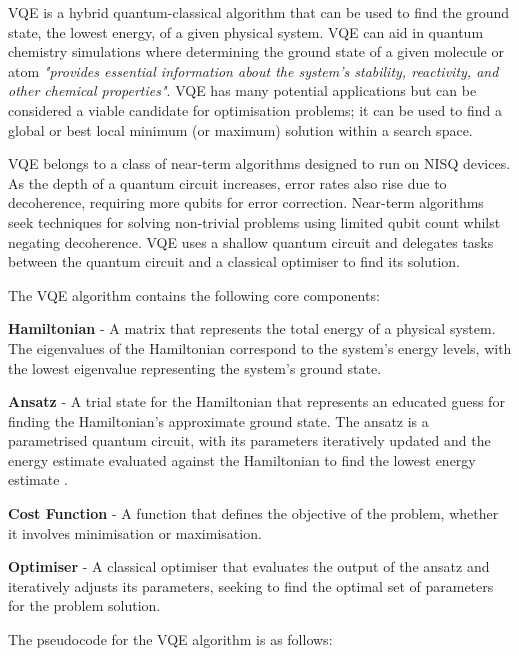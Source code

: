 \documentclass{article}
\begin{document}
{VQE is a hybrid quantum-classical algorithm that can be used to find the ground state, the lowest energy, of a given physical system\cite{wikivqe}. VQE can aid in quantum chemistry simulations where determining the ground state of a given molecule or atom \textit{"provides essential information about the system's stability, reactivity, and other chemical properties"}\cite{queragroundstate}. VQE has many potential applications but can be considered a viable candidate for optimisation problems; it can be used to find a global or best local minimum (or maximum) solution within a search space\cite{vqeqiskit}\cite{VQEMax}. 

VQE belongs to a class of near-term algorithms designed to run on NISQ devices. As the depth of a quantum circuit increases, error rates also rise due to decoherence, requiring more qubits for error correction. Near-term algorithms seek techniques for solving non-trivial problems using limited qubit count whilst negating decoherence\cite{Huang_2023}. VQE uses a shallow quantum circuit and delegates tasks between the quantum circuit and a classical optimiser to find its solution\cite{vqeqiskit}\cite{Peruzzo2014}.

The VQE algorithm contains the following core components:

\textbf{Hamiltonian} - A matrix that represents the total energy of a physical system\cite{hamiltonian}. The eigenvalues of the Hamiltonian correspond to the system's energy levels, with the lowest eigenvalue representing the system's ground state\cite{vqeqiskit}.

\textbf{Ansatz} - A trial state for the Hamiltonian that represents an educated guess for finding the Hamiltonian's approximate ground state. The ansatz is a parametrised quantum circuit, with its parameters iteratively updated and the energy estimate evaluated against the Hamiltonian to find the lowest energy estimate\cite{ansatz} \cite{wikiansatz} \cite{Tutorial}.

\textbf{Cost Function} - A function that defines the objective of the problem, whether it involves minimisation or maximisation\cite{vqeqiskit}.

\textbf{Optimiser} - A classical optimiser that evaluates the output of the ansatz and iteratively adjusts its parameters, seeking to find the optimal set of parameters for the problem solution\cite{Tutorial}\cite{vqeqiskit}. 

The pseudocode for the VQE algorithm is as follows:

}
\end{document}
